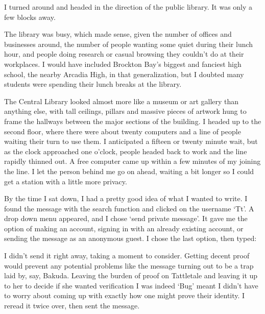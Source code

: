 I turned around and headed in the direction of the public library.  It was only a few blocks away.



The library was busy, which made sense, given the number of offices and businesses around, the number of people wanting some quiet during their lunch hour, and people doing research or casual browsing they couldn't do at their workplaces.  I would have included Brockton Bay's biggest and fanciest high school, the nearby Arcadia High, in that generalization, but I doubted many students were spending their lunch breaks at the library.



The Central Library looked almost more like a museum or art gallery than anything else, with tall ceilings, pillars and massive pieces of artwork hung to frame the hallways between the major sections of the building.  I headed up to the second floor, where there were about twenty computers and a line of people waiting their turn to use them.  I anticipated a fifteen or twenty minute wait, but as the clock approached one o'clock, people headed back to work and the line rapidly thinned out.  A free computer came up within a few minutes of my joining the line. I let the person behind me go on ahead, waiting a bit longer so I could get a station with a little more privacy.



By the time I sat down, I had a pretty good idea of what I wanted to write.  I found the message with the search function and clicked on the username `Tt'.  A drop down menu appeared, and I chose `send private message'.  It gave me the option of making an account, signing in with an already existing account, or sending the message as an anonymous guest.  I chose the last option, then typed:




I didn't send it right away, taking a moment to consider.  Getting decent proof would prevent any potential problems like the message turning out to be a trap laid by, say, Bakuda.  Leaving the burden of proof on Tattletale and leaving it up to her to decide if she wanted verification I was indeed `Bug' meant I didn't have to worry about coming up with exactly how one might prove their identity.  I reread it twice over, then sent the message.



